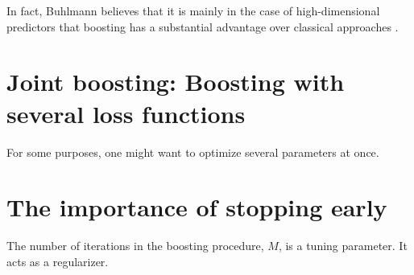 In fact, Buhlmann believes that it is mainly in the case of high-dimensional predictors that boosting has a substantial advantage over classical approaches \citep{buhlmann2006}.

\section{Joint boosting: Boosting with several loss functions}
For some purposes, one might want to optimize several parameters at once.

\section{The importance of stopping early}
The number of iterations in the boosting procedure, $M$, is a tuning parameter. It acts as a regularizer.